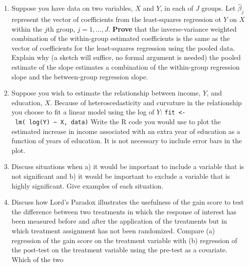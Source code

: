 \documentclass[
]{article}
\begin{document}
\vspace{0px}

\begin{enumerate}
\def\labelenumi{\arabic{enumi}.}
\setcounter{enumi}{101}
\item
  Suppose you have data on two variables, \(X\) and \(Y\), in each of
  \(J\) groups. Let \(\hat{\beta}_j\) represent the vector of
  coefficients from the least-squares regression ot \(Y\) on \(X\)
  within the \(j\)th group, \(j = 1, \ldots, J\). \textbf{Prove} that
  the inverse-variance weighted combination of the within-group
  estimated coefficients is the same as the vector of coefficients for
  the least-squares regression using the pooled data. Explain why (a
  sketch will suffice, no formal argument is needed) the pooled estimate
  of the slope estimates a combination of the within-group regression
  slope and the between-group regression slope. \vspace{0px}
\item
  Suppose you wish to estimate the relationship between income, \(Y\),
  and education, \(X\). Because of heteroscedasticity and curvature in
  the relationship you choose to fit a linear model using the log of
  \(Y\): \newline\newline
  \texttt{fit\ \textless{}-\ lm(\ log(Y)\ \textasciitilde{}\ X,\ data)}
  \newline\newline Write the R code you would use to plot the estimated
  increase in income associated with an extra year of education as a
  function of years of education. It is not necessary to include error
  bars in the plot. \vspace{0px}
\item
  Discuss situations when a) it would be important to include a variable
  that is not significant and b) it would be important to exclude a
  variable that is highly significant. Give examples of each situation.
  \vspace{0px}
\item
  Discuss how Lord's Paradox illustrates the usefulness of the gain
  score to test the difference between two treatments in which the
  response of interest has been measured before and after the
  application of the treatments but in which treatment assignment has
  not been randomized. Compare (a) regression of the gain score on the
  treatment variable with (b) regression of the post-test on the
  treatment variable using the pre-test as a covariate. Which of the two

\end{enumerate}
\end{document}
